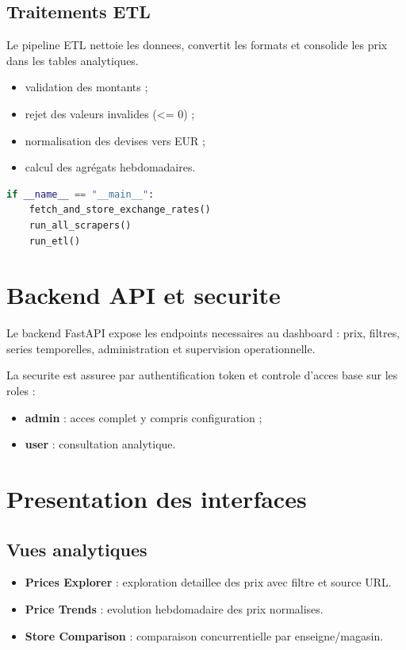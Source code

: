 \subsection{Traitements ETL}
Le pipeline ETL nettoie les donnees, convertit les formats et consolide les prix dans les tables analytiques.

\begin{itemize}[leftmargin=1.2cm]
	\item validation des montants ;
	\item rejet des valeurs invalides (<= 0) ;
	\item normalisation des devises vers EUR ;
	\item calcul des agrégats hebdomadaires.
\end{itemize}

\begin{lstlisting}[language=Python,caption={Orchestration simplifiee du pipeline principal}]
if __name__ == "__main__":
    fetch_and_store_exchange_rates()
    run_all_scrapers()
    run_etl()
\end{lstlisting}


\section{Backend API et securite}
Le backend FastAPI expose les endpoints necessaires au dashboard : prix, filtres, series temporelles, administration et supervision operationnelle.

La securite est assuree par authentification token et controle d'acces base sur les roles :
\begin{itemize}[leftmargin=1.2cm]
	\item \textbf{admin} : acces complet y compris configuration ;
	\item \textbf{user} : consultation analytique.
\end{itemize}


\section{Presentation des interfaces}
\subsection{Vues analytiques}
\begin{itemize}[leftmargin=1.2cm]
	\item \textbf{Prices Explorer} : exploration detaillee des prix avec filtre et source URL.
	\item \textbf{Price Trends} : evolution hebdomadaire des prix normalises.
	\item \textbf{Store Comparison} : comparaison concurrentielle par enseigne/magasin.
\end{itemize}

